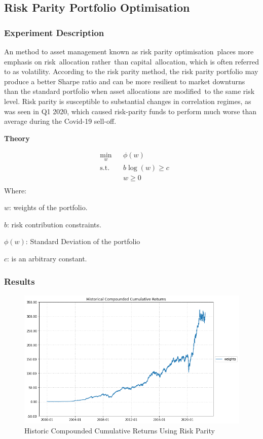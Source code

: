 \subsection{Risk Parity Portfolio Optimisation}
\subsubsection{Experiment Description}
An method to asset management known as risk parity optimisation places more emphasis on risk allocation rather than capital allocation, which is often referred to as volatility. According to the risk parity method, the risk parity portfolio may produce a better Sharpe ratio and can be more resilient to market downturns than the standard portfolio when asset allocations are modified to the same risk level. Risk parity is susceptible to substantial changes in correlation regimes, as was seen in Q1 2020, which caused risk-parity funds to perform much worse than average during the Covid-19 sell-off.

\textbf{Theory}

\[\begin{aligned}
&\underset{w}{\min} & & \phi(w) \\
&\text{s.t.} & & b \log(w) \geq c \\
& & & w \geq 0 \\
\end{aligned}\]
Where:

$w$: weights of the portfolio.

$b$: risk contribution constraints.

$\phi(w)$: Standard Deviation of the portfolio

$c$: is an arbitrary constant.

\subsubsection{Results}

\begin{figure}[H]
\centering
   \includegraphics[width=1.0\textwidth]{RP/Historic.png}
      \caption{Historic Compounded Cumulative Returns Using Risk Parity}
       \label{RP_HCCR}
\end{figure}


